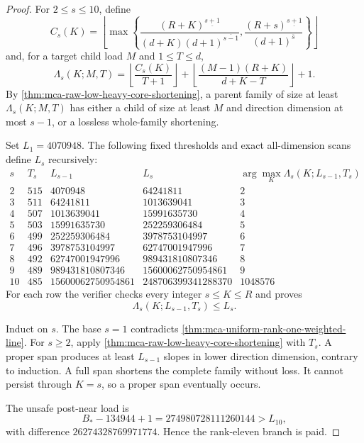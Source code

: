 \documentclass[11pt,a4paper]{amsart}
\numberwithin{equation}{section}
\theoremstyle{remark}
\begin{document}
\begin{proof}
For \(2\le s\le10\),
define
\[
 C_s(K)=\left\lfloor\max\left\{
 \frac{(R+K)^{\underline{s+1}}}
      {(d+K)(d+1)^{\overline{s-1}}},
 \frac{(R+s)^{\underline{s+1}}}
      {(d+1)^{\overline s}}
 \right\}\right\rfloor
\]
and, for a target child load \(M\) and \(1\le T\le d\),
\[
 \Lambda_s(K;M,T)=
 \left\lfloor\frac{C_s(K)}{T+1}\right\rfloor+
 \left\lfloor\frac{(M-1)(R+K)}{d+K-T}\right\rfloor+1.
 \tag{R11L}\label{eq:mca-rank-eleven-raw-low-threshold}
\]
By \cref{thm:mca-raw-low-heavy-core-shortening}, a parent family of size at
least \(\Lambda_s(K;M,T)\) has either a child of size at least \(M\) and
direction dimension at most \(s-1\), or a lossless whole-family shortening.

Set \(L_1=4070948\).  The following fixed thresholds and exact all-dimension
scans define \(L_s\) recursively:
\[
\begin{array}{c|r|r|r|r}
s&T_s&L_{s-1}&L_s&\arg\max_K\Lambda_s(K;L_{s-1},T_s)\\ \hline
2&515&4070948&64241811&2\\
3&511&64241811&1013639041&3\\
4&507&1013639041&15991635730&4\\
5&503&15991635730&252259306484&5\\
6&499&252259306484&3978753104997&6\\
7&496&3978753104997&62747001947996&7\\
8&492&62747001947996&989431810807346&8\\
9&489&989431810807346&15600062750954861&9\\
10&485&15600062750954861&248706399341288370&1048576
\end{array}
\tag{R11}\label{eq:mca-rank-eleven-raw-low-recurrence}
\]
For each row the verifier checks every integer \(s\le K\le R\) and proves
\[
 \Lambda_s(K;L_{s-1},T_s)\le L_s.
 \tag{R11I}\label{eq:mca-rank-eleven-raw-low-scan}
\]

Induct on \(s\).  The base \(s=1\) contradicts
\cref{thm:mca-uniform-rank-one-weighted-line}.  For \(s\ge2\), apply
\cref{thm:mca-raw-low-heavy-core-shortening} with \(T_s\).  A proper span
produces at least \(L_{s-1}\) slopes in lower direction dimension, contrary
to induction.  A full span shortens the complete family without loss.  It
cannot persist through \(K=s\), so a proper span eventually occurs.

The unsafe post-near load is
\[
 B_*-134944+1=274980728111260144>L_{10},
\]
with difference \(26274328769971774\).  Hence the rank-eleven branch is
paid.
\end{proof}
\end{document}
